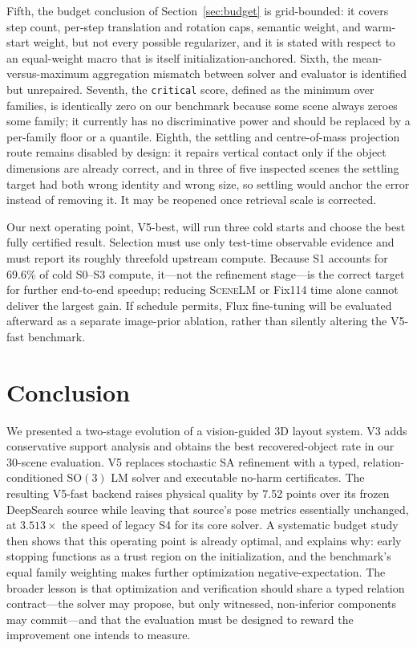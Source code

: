 \documentclass[10pt,twocolumn]{article}
\newcommand{\method}{\textsc{SceneLM}}
\begin{document}
Fifth, the budget conclusion of Section~\ref{sec:budget} is grid-bounded: it
covers step count, per-step translation and rotation caps, semantic weight, and
warm-start weight, but not every possible regularizer, and it is stated with
respect to an equal-weight macro that is itself initialization-anchored.
Sixth, the mean-versus-maximum aggregation mismatch between solver and
evaluator is identified but unrepaired.  Seventh, the \texttt{critical} score,
defined as the minimum over families, is identically zero on our benchmark
because some scene always zeroes some family; it currently has no
discriminative power and should be replaced by a per-family floor or a
quantile.  Eighth, the settling and centre-of-mass projection route remains
disabled by design: it repairs vertical contact only if the object dimensions
are already correct, and in three of five inspected scenes the settling target
had both wrong identity and wrong size, so settling would anchor the error
instead of removing it.  It may be reopened once retrieval scale is corrected.

Our next operating point, V5-best, will run three cold starts and choose the
best fully certified result.  Selection must use only test-time observable
evidence and must report its roughly threefold upstream compute.  Because S1
accounts for 69.6\% of cold S0--S3 compute, it---not the refinement
stage---is the correct target for further end-to-end speedup; reducing
\method{} or Fix114 time alone cannot deliver the largest gain.  If schedule
permits, Flux fine-tuning will be evaluated afterward as a separate image-prior
ablation, rather than silently altering the V5-fast benchmark.

\section{Conclusion}

We presented a two-stage evolution of a vision-guided 3D layout system.  V3
adds conservative support analysis and obtains the best recovered-object rate
in our 30-scene evaluation.  V5 replaces stochastic SA refinement with a typed,
relation-conditioned $\mathrm{SO}(3)$ LM solver and executable no-harm
certificates.  The resulting V5-fast backend raises physical quality by
7.52 points over its frozen DeepSearch source while leaving that source's pose
metrics essentially unchanged, at $3.513\times$ the speed of legacy S4 for its
core solver.  A systematic budget study then shows that this operating point is
already optimal, and explains why: early stopping functions as a trust region
on the initialization, and the benchmark's equal family weighting makes further
optimization negative-expectation.  The broader lesson is that optimization and
verification should share a typed relation contract---the solver may propose,
but only witnessed, non-inferior components may commit---and that the
evaluation must be designed to reward the improvement one intends to measure.
\end{document}
